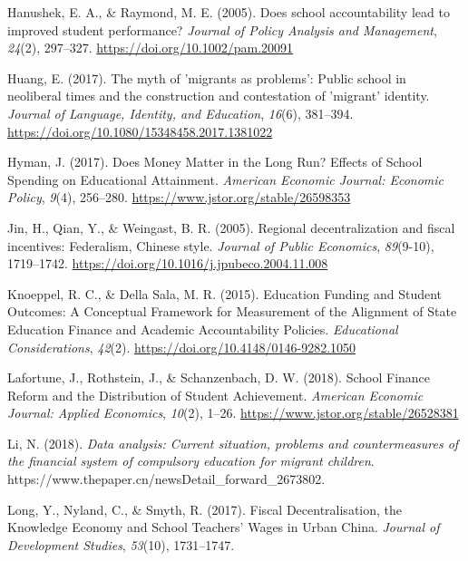 \documentclass[
  man,
  floatsintext,
  longtable,
  nolmodern,
  notxfonts,
  notimes,
  colorlinks=true,linkcolor=blue,citecolor=blue,urlcolor=blue]{apa7}
\newlength{\cslhangindent}
\newenvironment{CSLReferences}[2] %
 {\begin{list}{}{%
  \setlength{\itemindent}{0pt}
  \setlength{\leftmargin}{0pt}
  \setlength{\parsep}{0pt}
  \ifodd #1
   \setlength{\leftmargin}{\cslhangindent}
   \setlength{\itemindent}{-1\cslhangindent}
  \fi
  \setlength{\itemsep}{#2\baselineskip}}}
 {\end{list}}
\begin{document}
\begin{CSLReferences}{1}{0}
Hanushek, E. A., \& Raymond, M. E. (2005). Does school accountability
lead to improved student performance? \emph{Journal of Policy Analysis
and Management}, \emph{24}(2), 297--327.
\url{https://doi.org/10.1002/pam.20091}

Huang, E. (2017). The myth of 'migrants as problems': {Public} school in
neoliberal times and the construction and contestation of 'migrant'
identity. \emph{Journal of Language, Identity, and Education},
\emph{16}(6), 381--394.
\url{https://doi.org/10.1080/15348458.2017.1381022}

Hyman, J. (2017). Does {Money Matter} in the {Long Run}? {Effects} of
{School Spending} on {Educational Attainment}. \emph{American Economic
Journal: Economic Policy}, \emph{9}(4), 256--280.
\url{https://www.jstor.org/stable/26598353}

Jin, H., Qian, Y., \& Weingast, B. R. (2005). Regional decentralization
and fiscal incentives: {Federalism}, {Chinese} style. \emph{Journal of
Public Economics}, \emph{89}(9-10), 1719--1742.
\url{https://doi.org/10.1016/j.jpubeco.2004.11.008}

Knoeppel, R. C., \& Della Sala, M. R. (2015). Education {Funding} and
{Student Outcomes}: {A Conceptual Framework} for {Measurement} of the
{Alignment} of {State Education Finance} and {Academic Accountability
Policies}. \emph{Educational Considerations}, \emph{42}(2).
\url{https://doi.org/10.4148/0146-9282.1050}

Lafortune, J., Rothstein, J., \& Schanzenbach, D. W. (2018). School
{Finance Reform} and the {Distribution} of {Student Achievement}.
\emph{American Economic Journal: Applied Economics}, \emph{10}(2),
1--26. \url{https://www.jstor.org/stable/26528381}

Li, N. (2018). \emph{{Data analysis: Current situation, problems and
countermeasures of the financial system of compulsory education for
migrant children}}.
https://www.thepaper.cn/newsDetail\_forward\_2673802.

Long, Y., Nyland, C., \& Smyth, R. (2017). Fiscal {Decentralisation},
the {Knowledge Economy} and {School Teachers}' {Wages} in {Urban China}.
\emph{Journal of Development Studies}, \emph{53}(10), 1731--1747.


\end{CSLReferences}
\end{document}
